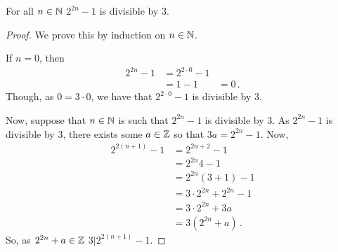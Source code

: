 \guard



\begin{prop}
\label{prop:evenPowersOf2Minus1DivisibleBy3}
  For all $n\in\mathbb{N}$ $2^{2n}-1$ is divisible by $3$.
\end{prop}
\begin{proof}
  We prove this by induction on $n\in\mathbb{N}$.

  If $n=0$, then
  \begin{align*}
    2^{2n}-1  &= 2^{2\cdot0}-1 \\
              &= 1 - 1
              &= 0\,.
  \end{align*}
  Though, as $0 = 3\cdot 0$, we have that $2^{2\cdot 0}-1$ is divisible by $3$.

  Now, suppose that $n\in\mathbb{N}$ is such that $2^{2n}-1$ is divisible by $3$.
  As $2^{2n}-1$ is divisible by $3$, there exists some $a\in\mathbb{Z}$ so that $3a = 2^{2n}-1$.
  Now,
  \begin{align*}
    2^{2(n+1)}-1  &= 2^{2n+2} - 1 \\
                  &= 2^{2n}4 - 1 \\
                  &= 2^{2n}(3+1) - 1 \\
                  &= 3\cdot 2^{2n} + 2^{2n} - 1 \\
                  &= 3\cdot 2^{2n} + 3a \\
                  &= 3( 2^{2n} + a )\,.
  \end{align*}
  So, as $2^{2n}+a\in\mathbb{Z}$ $3|2^{2(n+1)}-1$.
\end{proof}
